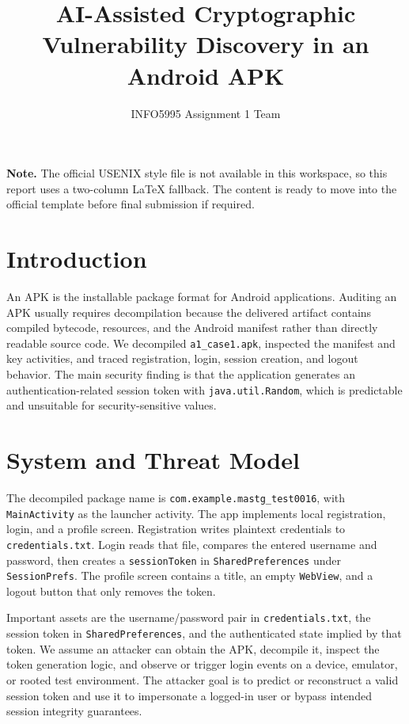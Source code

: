 ﻿\documentclass[10pt,twocolumn,letterpaper]{article}
\title{\bf AI-Assisted Cryptographic Vulnerability Discovery in an Android APK}
\author{INFO5995 Assignment 1 Team}
\date{}
\begin{document}
\maketitle

\noindent\textbf{Note.} The official USENIX style file is not available in this workspace, so this report uses a two-column LaTeX fallback. The content is ready to move into the official template before final submission if required.

\section*{Introduction}
An APK is the installable package format for Android applications. Auditing an APK usually requires decompilation because the delivered artifact contains compiled bytecode, resources, and the Android manifest rather than directly readable source code. We decompiled \texttt{a1\_case1.apk}, inspected the manifest and key activities, and traced registration, login, session creation, and logout behavior. The main security finding is that the application generates an authentication-related session token with \texttt{java.util.Random}, which is predictable and unsuitable for security-sensitive values.

\section*{System and Threat Model}
The decompiled package name is \texttt{com.example.mastg\_test0016}, with \texttt{MainActivity} as the launcher activity. The app implements local registration, login, and a profile screen. Registration writes plaintext credentials to \texttt{credentials.txt}. Login reads that file, compares the entered username and password, then creates a \texttt{sessionToken} in \texttt{SharedPreferences} under \texttt{SessionPrefs}. The profile screen contains a title, an empty \texttt{WebView}, and a logout button that only removes the token.

Important assets are the username/password pair in \texttt{credentials.txt}, the session token in \texttt{SharedPreferences}, and the authenticated state implied by that token. We assume an attacker can obtain the APK, decompile it, inspect the token generation logic, and observe or trigger login events on a device, emulator, or rooted test environment. The attacker goal is to predict or reconstruct a valid session token and use it to impersonate a logged-in user or bypass intended session integrity guarantees.
\end{document}
